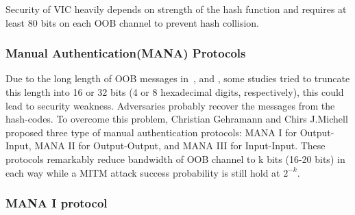 \begin{center}
\end{center}

Security of VIC heavily depends on strength of the hash function and requires at least 80 bits on each OOB channel to prevent hash collision. 
 
\subsubsection{Manual Authentication(MANA) Protocols}

Due to the long length of OOB messages in~\cite{1624021}, and \cite{Smetters02talkingto}, some studies tried to truncate this length into 16 or 32 bits (4 or 8 hexadecimal digits, respectively), this could lead to security weakness. Adversaries probably recover the messages from the hash-codes. To overcome this problem, Christian Gehramann and Chirs J.Michell \cite{Mitchell:2004p25948} proposed three type of manual authentication protocols: MANA I for Output-Input, MANA II for Output-Output, and MANA III for Input-Input. These protocols remarkably reduce bandwidth of OOB channel to k bits (16-20 bits) in each way while a MITM attack success probability is still hold at $2^{-k}$. 

\subsubsection*{MANA I protocol}

